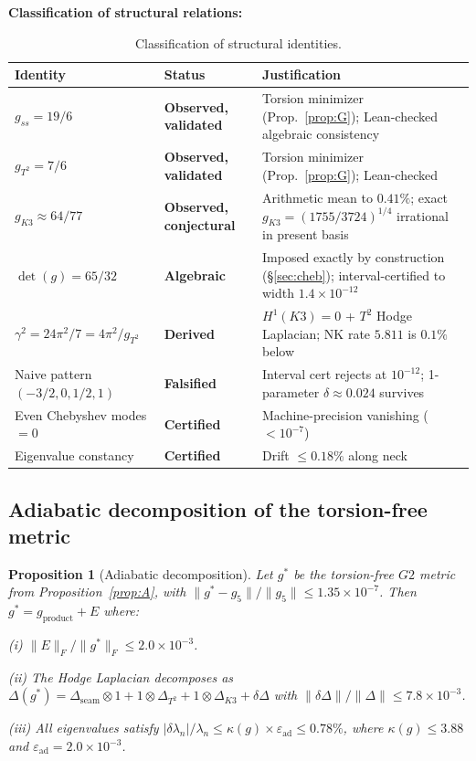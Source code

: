\documentclass[11pt,a4paper]{article}
\newtheorem{proposition}[theorem]{Proposition}
\theoremstyle{definition}
\theoremstyle{remark}
\newcommand{\Gtwo}{\mathrm{G}_2}
\def\Gtwo{G2}%
\begin{document}
\textbf{Classification of structural relations:}
\begin{table}[ht]
\centering
\small
\begin{tabular}{p{4.2cm} p{2.8cm} p{8.4cm}}
\toprule
Identity & Status & Justification \\
\midrule
$g_{ss} = 19/6$ & \textbf{Observed, validated} & Torsion minimizer (Prop.~\ref{prop:G}); Lean-checked algebraic consistency \\
$g_{T^2} = 7/6$ & \textbf{Observed, validated} & Torsion minimizer (Prop.~\ref{prop:G}); Lean-checked \\
$g_{K3} \approx 64/77$ & \textbf{Observed, conjectural} & Arithmetic mean to $0.41\%$; exact $g_{K3} = (1755/3724)^{1/4}$ irrational in present basis \\
$\det(g) = 65/32$ & \textbf{Algebraic} & Imposed exactly by construction (§\ref{sec:cheb}); interval-certified to width $1.4 \times 10^{-12}$ \\
$\gamma^2 = 24\pi^2/7 = 4\pi^2/g_{T^2}$ & \textbf{Derived} & $H^1(K3) = 0$ + $T^2$ Hodge Laplacian; NK rate $5.811$ is $0.1\%$ below \\
Naive pattern $(-3/2, 0, 1/2, 1)$ & \textbf{Falsified} & Interval cert rejects at $10^{-12}$; 1-parameter $\delta \approx 0.024$ survives \\
Even Chebyshev modes $= 0$ & \textbf{Certified} & Machine-precision vanishing ($< 10^{-7}$) \\
Eigenvalue constancy & \textbf{Certified} & Drift $\leq 0.18\%$ along neck \\
\bottomrule
\end{tabular}
\caption{Classification of structural identities.}
\end{table}

\subsection{Adiabatic decomposition of the torsion-free metric}

\begin{proposition}[Adiabatic decomposition]\label{prop:E}
Let $g^*$ be the torsion-free $\Gtwo$ metric from Proposition~\ref{prop:A}, with $\|g^* - g_5\|/\|g_5\| \leq 1.35 \times 10^{-7}$. Then $g^* = g_{\mathrm{product}} + E$ where:

\emph{(i)} $\|E\|_F / \|g^*\|_F \leq 2.0 \times 10^{-3}$.

\emph{(ii)} The Hodge Laplacian decomposes as $\Delta(g^*) = \Delta_{\mathrm{seam}} \otimes 1 + 1 \otimes \Delta_{T^2} + 1 \otimes \Delta_{K3} + \delta\Delta$ with $\|\delta\Delta\|/\|\Delta\| \leq 7.8 \times 10^{-3}$.

\emph{(iii)} All eigenvalues satisfy $|\delta\lambda_n|/\lambda_n \leq \kappa(g) \times \varepsilon_{\mathrm{ad}} \leq 0.78\%$, where $\kappa(g) \leq 3.88$ and $\varepsilon_{\mathrm{ad}} = 2.0 \times 10^{-3}$.
\end{proposition}
\end{document}
